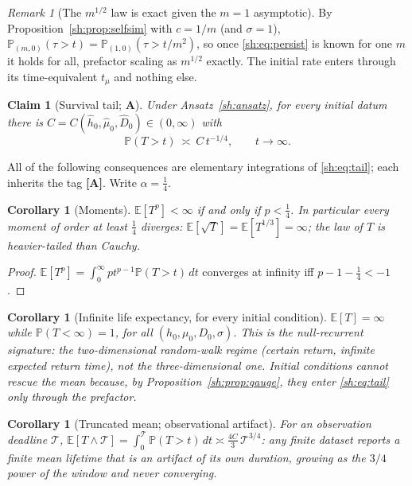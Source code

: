 \documentclass[11pt]{article}
\numberwithin{equation}{section}
\theoremstyle{plain}
\newtheorem{corollary}[theorem]{Corollary}
\newtheorem{claim}[theorem]{Claim}
\theoremstyle{definition}
\theoremstyle{remark}
\newtheorem{remark}[theorem]{Remark}
\newcommand{\E}{\mathbb{E}}
\newcommand{\PP}{\mathbb{P}}
\begin{document}
\begin{remark}[The $m^{1/2}$ law is exact given the $m=1$ asymptotic]
By Proposition~\ref{sh:prop:selfsim} with $c=1/m$ (and $\sigma=1$),
$\PP_{(m,0)}(\tau>t)=\PP_{(1,0)}(\tau>t/m^2)$, so once
\eqref{sh:eq:persist} is known for one $m$ it holds for all, prefactor
scaling as $m^{1/2}$ exactly. The initial rate enters through its
time-equivalent $t_\mu$ and nothing else.
\end{remark}

\begin{claim}[Survival tail; \textbf{A}]\label{sh:claim:tail}
Under Ansatz~\ref{sh:ansatz}, for every initial datum there is
$C=C(\hat h_0,\hat\mu_0,\hat D_0)\in(0,\infty)$ with
\begin{equation}\label{sh:eq:tail}
\PP(T>t)\ \asymp\ C\,t^{-1/4},\qquad t\to\infty .
\end{equation}
\end{claim}

All of the following consequences are elementary integrations of
\eqref{sh:eq:tail}; each inherits the tag \textbf{[A]}. Write
$\alpha=\tfrac14$.

\begin{corollary}[Moments]\label{sh:cor:moments}
$\E[T^p]<\infty$ if and only if $p<\tfrac14$. In particular every moment of
order at least $\tfrac14$ diverges: $\E[\sqrt T]=\E[T^{1/3}]=\infty$; the
law of $T$ is heavier-tailed than Cauchy.
\end{corollary}

\begin{proof}
$\E[T^p]=\int_0^\infty pt^{p-1}\PP(T>t)\,dt$ converges at infinity iff
$p-1-\tfrac14<-1$.
\end{proof}

\begin{corollary}[Infinite life expectancy, for every initial condition]
\label{sh:cor:mean}
$\E[T]=\infty$ while $\PP(T<\infty)=1$, for all
$(h_0,\mu_0,D_0,\sigma)$. This is the null-recurrent signature: the
two-dimensional random-walk regime (certain return, infinite expected
return time), not the three-dimensional one. Initial conditions cannot
rescue the mean because, by Proposition~\ref{sh:prop:gauge}, they enter
\eqref{sh:eq:tail} only through the prefactor.
\end{corollary}

\begin{corollary}[Truncated mean; observational artifact]\label{sh:cor:trunc}
For an observation deadline $\mathcal T$,
$\E[T\wedge\mathcal T]=\int_0^{\mathcal T}\PP(T>t)\,dt
\asymp\tfrac{4C}{3}\,\mathcal T^{3/4}$: any finite dataset reports a finite
mean lifetime that is an artifact of its own duration, growing as the
$3/4$ power of the window and never converging.
\end{corollary}
\end{document}
